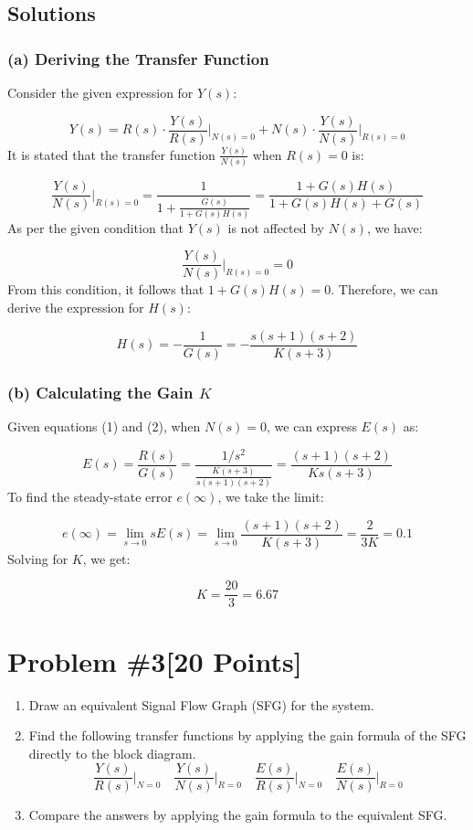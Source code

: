 \documentclass{article}
\begin{document}
\subsection*{Solutions}

\subsubsection*{(a) Deriving the Transfer Function}

Consider the given expression for \( Y(s) \):

\[
Y(s) = R(s) \cdot \frac{Y(s)}{R(s)} \bigg|_{N(s) = 0} + N(s) \cdot \frac{Y(s)}{N(s)} \bigg|_{R(s) = 0}
\]
It is stated that the transfer function \( \frac{Y(s)}{N(s)} \) when \( R(s) = 0 \) is:

\[
\frac{Y(s)}{N(s)} \bigg|_{R(s) = 0} = \frac{1}{1 + \frac{G(s)}{1 + G(s)H(s)}} = \frac{1 + G(s)H(s)}{1 + G(s)H(s) + G(s)}
\]
As per the given condition that \( Y(s) \) is not affected by \( N(s) \), we have:

\[
\frac{Y(s)}{N(s)} \bigg|_{R(s) = 0} = 0
\]
From this condition, it follows that \( 1 + G(s)H(s) = 0 \). Therefore, we can derive the expression for \( H(s) \):

\[
H(s) = -\frac{1}{G(s)} = -\frac{s(s+1)(s+2)}{K(s+3)}
\]

\subsubsection*{(b) Calculating the Gain \( K \)}
Given equations (1) and (2), when \( N(s) = 0 \), we can express \( E(s) \) as:

\[
E(s) = \frac{R(s)}{G(s)} = \frac{1/s^2}{\frac{K(s+3)}{s(s+1)(s+2)}} = \frac{(s+1)(s+2)}{Ks(s+3)}
\]
To find the steady-state error \( e(\infty) \), we take the limit:

\[
e(\infty) = \lim_{{s \to 0}} sE(s) = \lim_{{s \to 0}} \frac{(s+1)(s+2)}{K(s+3)} = \frac{2}{3K} = 0.1
\]
Solving for \( K \), we get:

\[
K = \frac{20}{3} = 6.67
\]


\newpage
\section*{Problem \#3[20 Points]}
\begin{enumerate}
    \item[a. ] Draw an equivalent Signal Flow Graph (SFG) for the system.
    \item[b. ] Find the following transfer functions by applying the gain formula of the SFG directly to the block diagram.
    \[
    \frac{Y(s)}{R(s)} \bigg|_{N=0} \quad \frac{Y(s)}{N(s)} \bigg|_{R=0} \quad \frac{E(s)}{R(s)} \bigg|_{N=0} \quad \frac{E(s)}{N(s)} \bigg|_{R=0}
    \]
    \item[c. ] Compare the answers by applying the gain formula to the equivalent SFG.
\end{enumerate}
\newline
\begin{figure}[htbp]
  \centering
  
\end{figure}
\end{document}
